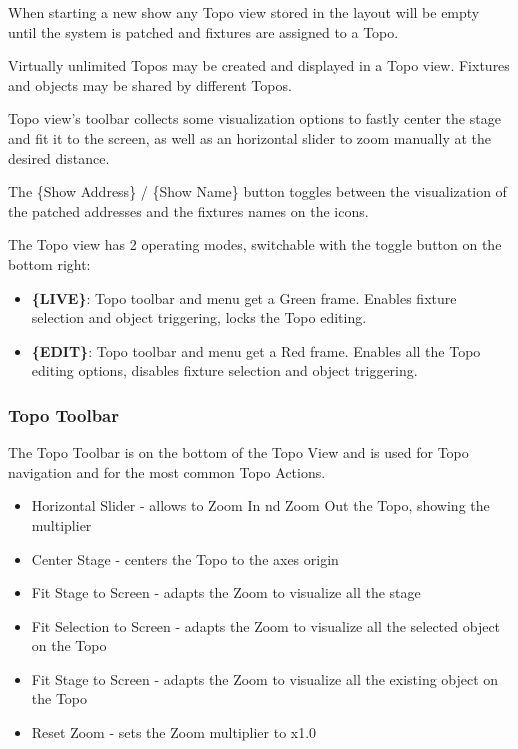 \documentclass[
]{article}
\begin{document}
When starting a new show any Topo view stored in the layout will be empty until the system is patched and fixtures are assigned to a Topo.

Virtually unlimited Topos may be created and displayed in a Topo view. Fixtures and objects may be shared by different Topos.

Topo view's toolbar collects some visualization options to fastly center the stage and fit it to the screen, as well as an horizontal slider to zoom manually at the desired distance.

The \{Show Address\} / \{Show Name\} button toggles between the visualization of the patched addresses and the fixtures names on the icons.

The Topo view has 2 operating modes, switchable with the toggle button on the bottom right:

\begin{itemize}
\item
  \textbf{\{LIVE\}}: Topo toolbar and menu get a {Green} frame. Enables fixture selection and object triggering, locks the Topo editing.
\item
  \textbf{\{EDIT\}}: Topo toolbar and menu get a {Red} frame. Enables all the Topo editing options, disables fixture selection and object triggering.
\end{itemize}

\hypertarget{topo-toolbar}{%
\subsubsection{Topo Toolbar}\label{topo-toolbar}}

The Topo Toolbar is on the bottom of the Topo View and is used for Topo navigation and for the most common Topo Actions.

\begin{itemize}
\item
  Horizontal Slider - allows to Zoom In nd Zoom Out the Topo, showing the multiplier
\item
  Center Stage - centers the Topo to the axes origin
\item
  Fit Stage to Screen - adapts the Zoom to visualize all the stage
\item
  Fit Selection to Screen - adapts the Zoom to visualize all the selected object on the Topo
\item
  Fit Stage to Screen - adapts the Zoom to visualize all the existing object on the Topo
\item
  Reset Zoom - sets the Zoom multiplier to x1.0
\end{itemize}
\end{document}
